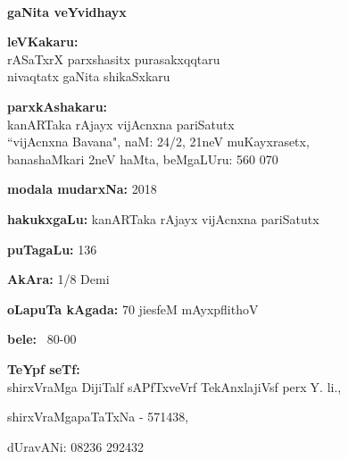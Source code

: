 ~
\thispagestyle{empty}

\vfill

\begin{center}
{\Large\bfseries gaNita veYvidhayx}\\

\smallskip
\smallskip
\smallskip

{\bfseries leVKakaru:}\\[0.1cm]
rASaTxrX parxshasitx purasakxqqtaru\\
nivaqtatx gaNita shikaSxkaru

\vfill

\smallskip

{\bfseries parxkAshakaru:}\\[0.1cm]
kanARTaka rAjayx vijAcnxna pariSatutx\\
``vijAcnxna Bavana", naM: {\rm 24/2}, {\rm 21}neV muKayxrasetx,\\
banashaMkari {\rm 2}neV haMta, beMgaLUru: {\rm 560 070}
\end{center}

\vfill

\begin{center}
{\bfseries modala mudarxNa:} {\rm 2018}

\vfill

{\bfseries hakukxgaLu:} kanARTaka rAjayx vijAcnxna pariSatutx

\vfill

{\bfseries puTagaLu:} {\rm 136}

\vfill

{\bfseries AkAra:} {\rm 1/8} Demi

\vfill

{\bfseries oLapuTa kAgada:} {\rm 70} jiesfeM mAyxpflithoV

\vfill

{\bfseries bele:} \rupee \ {\rm 80-00}

\vfill

{\bfseries TeYpf seTf:}\\
 shirxVraMga DijiTalf sAPfTxveVrf TekAnxlajiVsf perx$\;$Y. li.,

shirxVraMgapaTaTxNa - {\rm 571438}, 

\smallskip

 dUravANi: {\rm 08236 292432}

\vfill

\end{center}
